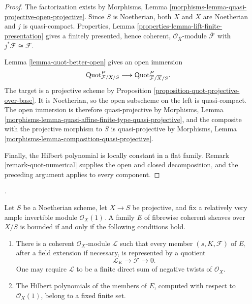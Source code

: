 \begin{proof}
The factorization exists by Morphisms, Lemma
\ref{morphisms-lemma-quasi-projective-open-projective}. Since $S$ is
Noetherian, both $X$ and $\overline{X}$ are Noetherian and $j$ is
quasi-compact. Properties, Lemma
\ref{properties-lemma-lift-finite-presentation} gives a finitely presented,
hence coherent, $\mathcal{O}_{\overline{X}}$-module
$\overline{\mathcal{F}}$ with
$j^*\overline{\mathcal{F}} \cong \mathcal{F}$.

Lemma \ref{lemma-quot-better-open} gives an open immersion
$$
\mathrm{Quot}^P_{\mathcal{F}/X/S} \longrightarrow
\mathrm{Quot}^P_{\overline{\mathcal{F}}/\overline{X}/S}.
$$
The target is a projective scheme by Proposition
\ref{proposition-quot-projective-over-base}. It is Noetherian, so the open
subscheme on the left is quasi-compact. The open immersion is therefore
quasi-projective by Morphisms, Lemma
\ref{morphisms-lemma-quasi-affine-finite-type-quasi-projective}, and the
composite with the projective morphism to $S$ is quasi-projective by
Morphisms, Lemma \ref{morphisms-lemma-composition-quasi-projective}.

Finally, the Hilbert polynomial is locally constant in a flat family.
Remark \ref{remark-quot-numerical} supplies the open and closed
decomposition, and the preceding argument applies to every component.
\end{proof}

\begin{proposition}
\label{proposition-bounded-coherent-Hilbert-polynomials}
\begin{reference}
\cite[Expos\'e 221, Theorem 2.1 and its erratum, pp. 253--254 and 302]{FGA}.
\end{reference}
Let $S$ be a Noetherian scheme, let $X \to S$ be projective, and fix a
relatively very ample invertible module $\mathcal{O}_X(1)$. A family $E$
of fibrewise coherent sheaves over $X/S$ is bounded if and only if the
following conditions hold.
\begin{enumerate}
\item There is a coherent $\mathcal{O}_X$-module $\mathcal{L}$ such that
every member $(s,K,\mathcal{F})$ of $E$, after a field extension if
necessary, is represented by a quotient
$$
\mathcal{L}_K \longrightarrow \mathcal{F} \longrightarrow 0.
$$
One may require $\mathcal{L}$ to be a finite direct sum of negative twists
of $\mathcal{O}_X$.
\item The Hilbert polynomials of the members of $E$, computed with respect
to $\mathcal{O}_X(1)$, belong to a fixed finite set.
\end{enumerate}
\end{proposition}

